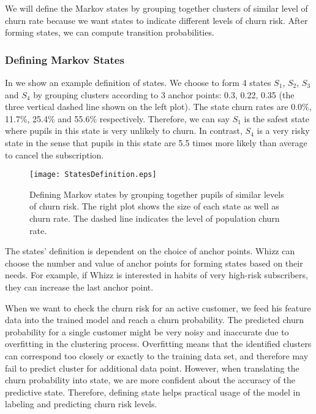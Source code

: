We will define the Markov states by grouping together clusters of similar level of churn rate because we want states to indicate different levels of churn risk. After forming states, we can compute transition probabilities.

\subsubsection{Defining Markov States}

In  we show an example definition of states. We choose to form 4 states $S_1$, $S_2$, $S_3$ and $S_4$ by grouping clusters according to 3 anchor points: 0.3, 0.22, 0.35 (the three vertical dashed line shown on the left plot). The state churn rates are 0.0\%, 11.7\%, 25.4\% and 55.6\% respectively. Therefore, we can say $S_1$ is the safest state where pupils in this state is very unlikely to churn. In contrast, $S_4$ is a very risky state in the sense that pupils in this state are 5.5 times more likely than average to cancel the subscription.

\begin{figure}[!h]
\centering
\texttt{[image: StatesDefinition.eps]}
\caption{Defining Markov states by grouping together pupils of similar levels of churn risk. The right plot shows the size of each state as well as churn rate. The dashed line indicates the level of population churn rate.}
\label{fig:statesDefinition}
\end{figure}

The states' definition is dependent on the choice of anchor points. Whizz can choose the number and value of anchor points for forming states based on their needs. For example, if Whizz is interested in habits of very high-risk subscribers, they can increase the last anchor point.

When we want to check the churn risk for an active customer, we feed his feature data into the trained model and reach a churn probability. The predicted churn probability for a single customer might be very noisy and inaccurate due to overfitting in the clustering process. Overfitting means that the identified clusters can correspond too closely or exactly to the training data set, and therefore may fail to predict cluster for additional data point. However, when translating the churn probability into state, we are more confident about the accuracy of the predictive state. Therefore, defining state helps practical usage of the model in labeling and predicting churn risk levels.

